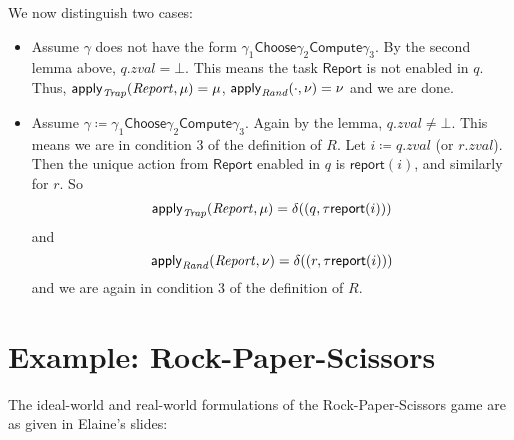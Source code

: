 \documentclass[10pt]{article}
\begin{document}
\begin{itemize}
We now distinguish two cases:
\begin{itemize}
\item Assume $\gamma$ does not have the form $\gamma_1 \mathsf{Choose} \gamma_2 \mathsf{Compute} \gamma_3$. By the second lemma above, $q.zval = \bot$. This means the task $\mathsf{Report}$ is not enabled in $q$. Thus, $\mathsf{apply}_\mathit{Trap}(\mathit{Report},\mu) = \mu$, $\mathsf{apply}_\mathit{Rand}(\cdot,\nu) = \nu$ and we are done.

\item Assume $\gamma \coloneqq \gamma_1 \mathsf{Choose} \gamma_2 \mathsf{Compute} \gamma_3$. Again by the lemma, $q.zval \neq \bot$. This means we are in condition 3 of the definition of $R$. Let $i \coloneqq q.zval$ (or $r.zval$). Then the unique action from $\mathsf{Report}$ enabled in $q$ is $\mathsf{report}(i)$, and similarly for $r$. So
\[ \mathsf{apply}_\mathit{Trap}(\mathit{Report},\mu) = \delta((q,\tau \mathsf{report}(i))) \]
and
\[ \mathsf{apply}_\mathit{Rand}(\mathit{Report},\nu) = \delta((r,\tau \mathsf{report}(i))) \]
and we are again in condition 3 of the definition of $R$.
\end{itemize}
\end{itemize}


\section{Example: Rock-Paper-Scissors}
The ideal-world and real-world formulations of the Rock-Paper-Scissors game are as given in Elaine's slides:
\end{document}
